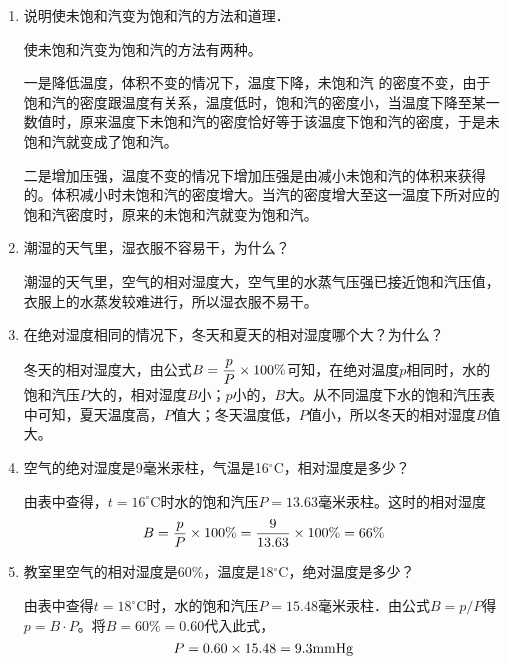 \begin{enumerate}
	\item 说明使未饱和汽变为饱和汽的方法和道理．
    
  \begin{solution}
使未饱和汽变为饱和汽的方法有两种。

一是降低温度，体积不变的情况下，温度下降，未饱和汽
的密度不变，由于饱和汽的密度跟温度有关系，温度低时，饱和汽的密度小，当温度下降至某一数值时，原来温度下未饱和汽的密度恰好等于该温度下饱和汽的密度，于是未饱和汽就变成了饱和汽。

二是增加压强，温度不变的情况下增加压强是由减小未饱和汽的体积来获得的。体积减小时未饱和汽的密度增大。当汽的密度增大至这一温度下所对应的饱和汽密度时，原来的未饱和汽就变为饱和汽。
  \end{solution}
\item 潮湿的天气里，湿衣服不容易干，为什么？
    
\begin{solution}
  潮湿的天气里，空气的相对湿度大，空气里的水蒸气压强已接近饱和汽压值，衣服上的水蒸发较难进行，所以湿衣服不易干。
\end{solution}
\item 在绝对湿度相同的情况下，冬天和夏天的相对湿度哪个大？为什么？
    
\begin{solution}
冬天的相对湿度大，由公式$B=\dfrac{p}{P}\times 100\%$可知，在绝对温度$p$相同时，水的饱和汽压$P$大的，相对湿度$B$小；$p$小的，$B$大。从不同温度下水的饱和汽压表中可知，夏天温度高，$P$值大；冬天温度低，$P$值小，所以冬天的相对湿度$B$值大。
\end{solution}
\item 空气的绝对湿度是9毫米汞柱，气温是16$^\circ$C，相对湿度是多少？
    
\begin{solution}
由表中查得，$t=16^{\circ}$C时水的饱和汽压$P=13.63$毫米汞柱。这时的相对湿度
\[B=\frac{p}{P}\times100\%=\frac{9}{13.63}\times100\%=66\%\]
\end{solution}
\item 教室里空气的相对湿度是60\%，温度是18$^\circ$C，绝对温度是多少？
    
\begin{solution}
  由表中查得$t=18^{\circ}$C时，水的饱和汽压$P=15.48$毫米汞柱．由公式$B=p/P$得$p=B\cdot P$。将$B=60\%=0.60$代入此式，
  \[P=0.60\times15.48=9.3{\rm mmHg}\]
\end{solution}
\end{enumerate}



